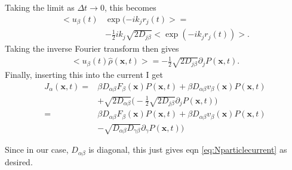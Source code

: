 \documentclass[twocolumn,amsmath,amssymb,aps]{revtex4-1}%
\begin{document}
Taking the limit as $\Delta t\to0$, this becomes
\begin{align}
  <u_{\beta}(t)&\exp(-ik_jr_j(t)>=\nonumber\\
  &-\frac{1}{2}ik_j\sqrt{2D_{j\beta}}\bigg<\exp(-ik_jr_j(t))\bigg>.
\end{align}
Taking the inverse Fourier transform then gives
\begin{align}
  <u_{\beta}(t)\hat{\rho}(\bm{x},t)>=-\frac{1}{2}\sqrt{2D_{j\beta}}
  \partial_jP(\bm{x},t).
\end{align}
Finally, inserting this into the current I get
\begin{align}
  J_{\alpha}(\bm{x},t)=
  &\beta D_{\alpha\beta}F_{\beta}(\bm{x})P(\bm{x},t)
  +\beta D_{\alpha\beta}v_{\beta}(\bm{x})P(\bm{x},t)\nonumber\\
  &+\sqrt{2D_{\alpha\beta}}\bigg(-\frac{1}{2}\sqrt{2D_{j\beta}}
  \partial_jP(\bm{x},t)\bigg)\nonumber\\
  =&\beta D_{\alpha\beta}F_{\beta}(\bm{x})P(\bm{x},t)
  +\beta D_{\alpha\beta}v_{\beta}(\bm{x})P(\bm{x},t)\nonumber\\
  &-\sqrt{D_{\alpha\beta}D_{\gamma\beta}}
  \partial_{\gamma}P(\bm{x},t))
\end{align}

Since in our case, $D_{\alpha\beta}$ is diagonal, this just gives eqn
\ref{eq:Nparticlecurrent} as desired.



\end{document}
